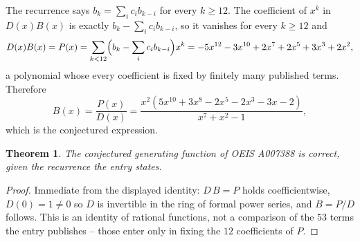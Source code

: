 \documentclass[11pt,a4paper]{article}
\theoremstyle{plain}
\newtheorem{theorem}{Theorem}
\theoremstyle{definition}
\begin{document}
The recurrence says $b_k=\sum_i c_ib_{k-i}$ for every $k\ge 12$. The coefficient of $x^k$ in
$D(x)B(x)$ is exactly $b_k-\sum_i c_ib_{k-i}$, so it vanishes for every $k\ge 12$ and
\[
  D(x)B(x)=P(x)=\sum_{k<12}\Bigl(b_k-\sum_i c_ib_{k-i}\Bigr)x^k
         =- 5 x^{12} - 3 x^{10} + 2 x^{7} + 2 x^{5} + 3 x^{3} + 2 x^{2} ,
\]
a polynomial whose every coefficient is fixed by finitely many published terms. Therefore
\[
  B(x)=\frac{P(x)}{D(x)}=\frac{x^{2} \left(5 x^{10} + 3 x^{8} - 2 x^{5} - 2 x^{3} - 3 x - 2\right)}{x^{7} + x^{2} - 1} ,
\]
which is the conjectured expression.

\begin{theorem}
The conjectured generating function of OEIS A007388 is correct, given the recurrence the entry
states.
\end{theorem}

\begin{proof}
Immediate from the displayed identity: $D\,B=P$ holds coefficientwise, $D(0)=1\ne0$ so $D$ is
invertible in the ring of formal power series, and $B=P/D$ follows. This is an identity of
rational functions, not a comparison of the $53$ terms the entry publishes -- those
enter only in fixing the $12$ coefficients of $P$.
\end{proof}
\end{document}
